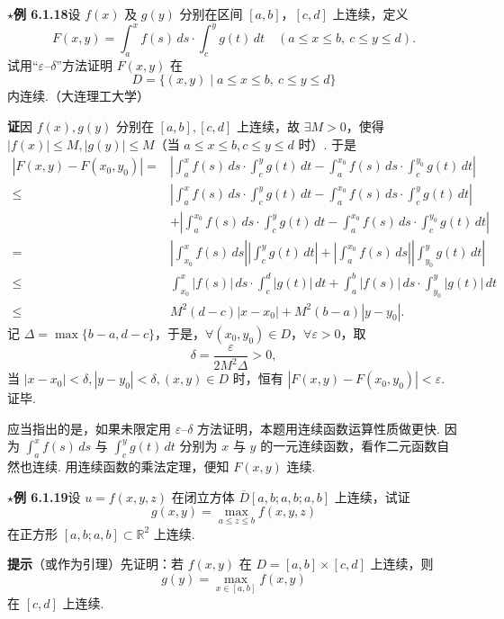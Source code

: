 \documentclass[UTF8,12pt,a4paper,fontset=fandol]{ctexart}
\begin{document}
\noindent\textbf{$\star$例 6.1.18}\quad 设 $f(x)$ 及 $g(y)$ 分别在区间 $[a,b]$，$[c,d]$ 上连续，定义
\[
  F(x,y)=\int_a^x f(s)\,ds\cdot\int_c^y g(t)\,dt
  \quad(a\le x\le b,\ c\le y\le d).
\]
试用“$\varepsilon$--$\delta$”方法证明 $F(x,y)$ 在
\[
  D=\{(x,y)\mid a\le x\le b,\ c\le y\le d\}
\]
内连续.（大连理工大学）

\noindent\textbf{证}\quad 因 $f(x),g(y)$ 分别在 $[a,b],[c,d]$ 上连续，故 $\exists M>0$，使得 $|f(x)|\le M,|g(y)|\le M$（当 $a\le x\le b,c\le y\le d$ 时）. 于是
\[
\begin{aligned}
|F(x,y)-F(x_0,y_0)|
={}&\left|\int_a^x f(s)\,ds\cdot\int_c^y g(t)\,dt
-\int_a^{x_0} f(s)\,ds\cdot\int_c^{y_0} g(t)\,dt\right|\\
\le{}&\left|\int_a^x f(s)\,ds\cdot\int_c^y g(t)\,dt
-\int_a^{x_0} f(s)\,ds\cdot\int_c^y g(t)\,dt\right|\\
&+\left|\int_a^{x_0} f(s)\,ds\cdot\int_c^y g(t)\,dt
-\int_a^{x_0} f(s)\,ds\cdot\int_c^{y_0} g(t)\,dt\right|\\
={}&\left|\int_{x_0}^x f(s)\,ds\right|
\left|\int_c^y g(t)\,dt\right|
+\left|\int_a^{x_0} f(s)\,ds\right|
\left|\int_{y_0}^y g(t)\,dt\right|\\
\le{}&\int_{x_0}^x |f(s)|\,ds\cdot\int_c^d |g(t)|\,dt
+\int_a^b |f(s)|\,ds\cdot\int_{y_0}^y |g(t)|\,dt\\
\le{}&M^2(d-c)|x-x_0|+M^2(b-a)|y-y_0|.
\end{aligned}
\]
记 $\Delta=\max\{b-a,d-c\}$，于是，$\forall(x_0,y_0)\in D$，$\forall\varepsilon>0$，取
\[
  \delta=\frac{\varepsilon}{2M^2\Delta}>0,
\]
当 $|x-x_0|<\delta,|y-y_0|<\delta,(x,y)\in D$ 时，恒有 $|F(x,y)-F(x_0,y_0)|<\varepsilon$. 证毕.

应当指出的是，如果未限定用 $\varepsilon$--$\delta$ 方法证明，本题用连续函数运算性质做更快. 因为 $\int_a^x f(s)\,ds$ 与 $\int_c^y g(t)\,dt$ 分别为 $x$ 与 $y$ 的一元连续函数，看作二元函数自然也连续. 用连续函数的乘法定理，便知 $F(x,y)$ 连续.

\noindent\textbf{$\star$例 6.1.19}\quad 设 $u=f(x,y,z)$ 在闭立方体 $\overline D[a,b;a,b;a,b]$ 上连续，试证
\[
  g(x,y)=\max_{a\le z\le b} f(x,y,z)
\]
在正方形 $[a,b;a,b]\subset\mathbb{R}^2$ 上连续.

\noindent\textbf{提示}\quad （或作为引理）先证明：若 $f(x,y)$ 在 $D=[a,b]\times[c,d]$ 上连续，则
\[
  g(y)=\max_{x\in[a,b]} f(x,y)
\]
在 $[c,d]$ 上连续.
\end{document}
